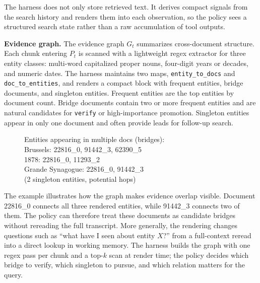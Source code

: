\documentclass{article}
\newcommand{\verify}{\texttt{verify}\xspace}
\begin{document}
The harness does not only store retrieved text. It derives compact signals from
the search history and renders them into each observation, so the policy sees a
structured search state rather than a raw accumulation of tool outputs.

\textbf{Evidence graph.}
The evidence graph $G_t$ summarizes cross-document structure. Each chunk entering
$P_t$ is scanned with a lightweight regex extractor for three entity classes:
multi-word capitalized proper nouns, four-digit years or decades, and numeric
dates. The harness maintains two maps, \texttt{entity\_to\_docs} and
\texttt{doc\_to\_entities}, and renders a compact block with frequent entities,
bridge documents, and singleton entities. Frequent entities are the top entities
by document count. Bridge documents contain two or more frequent entities and
are natural candidates for \verify or high-importance promotion. Singleton
entities appear in only one document and often provide leads for follow-up
search.

\begin{figure}
\vspace{-1.8em}
\begin{tcolorbox}[
  width=0.5\textwidth,
  colback=white,
  colframe=black!85,
  boxrule=0.8pt,
  arc=4pt,
  left=4pt,
  right=4pt,
  top=4pt,
  bottom=4pt,
  boxsep=0pt
]
\small{} Entities appearing in multiple docs (bridges):\\
\hspace*{1em}Brussels: \textcolor{docred}{22816\_0}, \textcolor{docblue}{91442\_3}, 62390\_5\\
\hspace*{1em}1878: \textcolor{docred}{22816\_0}, 11293\_2\\
\hspace*{1em}Grande Synagogue: \textcolor{docred}{22816\_0}, \textcolor{docblue}{91442\_3}\\
\hspace*{1em}(2 singleton entities, potential hops)
\end{tcolorbox}
\vspace{-1.2em}
\end{figure}

The example illustrates how the graph makes evidence overlap visible. Document
\textcolor{docred}{22816\_0} connects all three rendered entities, while
\textcolor{docblue}{91442\_3} connects two of them. The policy can therefore
treat these documents as candidate bridges without rereading the full
transcript. More generally, the rendering changes questions such as ``what have
I seen about entity $X$?'' from a full-context reread into a direct lookup in
working memory. The harness builds the graph with one regex pass per chunk and a
top-$k$ scan at render time; the policy decides which bridge to verify, which
singleton to pursue, and which relation matters for the query.
\end{document}
